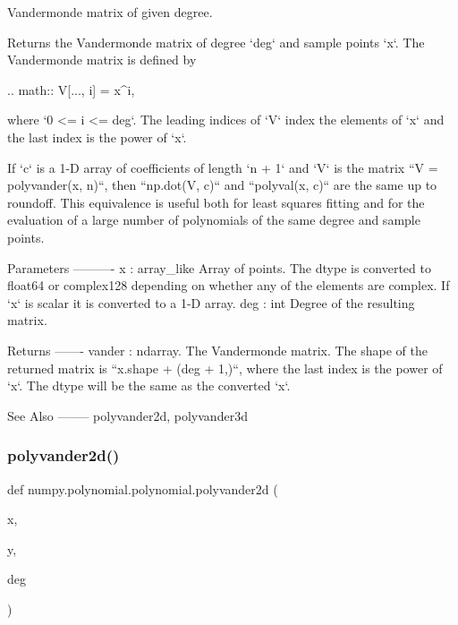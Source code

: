 \begin{DoxyVerb}Vandermonde matrix of given degree.

Returns the Vandermonde matrix of degree `deg` and sample points
`x`. The Vandermonde matrix is defined by

.. math:: V[..., i] = x^i,

where `0 <= i <= deg`. The leading indices of `V` index the elements of
`x` and the last index is the power of `x`.

If `c` is a 1-D array of coefficients of length `n + 1` and `V` is the
matrix ``V = polyvander(x, n)``, then ``np.dot(V, c)`` and
``polyval(x, c)`` are the same up to roundoff. This equivalence is
useful both for least squares fitting and for the evaluation of a large
number of polynomials of the same degree and sample points.

Parameters
----------
x : array_like
    Array of points. The dtype is converted to float64 or complex128
    depending on whether any of the elements are complex. If `x` is
    scalar it is converted to a 1-D array.
deg : int
    Degree of the resulting matrix.

Returns
-------
vander : ndarray.
    The Vandermonde matrix. The shape of the returned matrix is
    ``x.shape + (deg + 1,)``, where the last index is the power of `x`.
    The dtype will be the same as the converted `x`.

See Also
--------
polyvander2d, polyvander3d\end{DoxyVerb}
 \mbox{\label{namespacenumpy_1_1polynomial_1_1polynomial_a5be2e4cbb8f1f16a3eec0f1c72a8ef78}} 
\subsubsection{\texorpdfstring{polyvander2d()}{polyvander2d()}}
{\footnotesize\ttfamily def numpy.\+polynomial.\+polynomial.\+polyvander2d (\begin{DoxyParamCaption}\item[{}]{x,  }\item[{}]{y,  }\item[{}]{deg }\end{DoxyParamCaption})}

